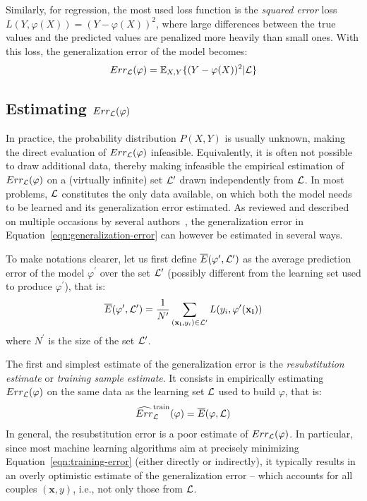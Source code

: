 Similarly, for regression, the most used loss function is the \textit{squared
error} loss $L(Y, \varphi(X)) = (Y - \varphi(X))^2$, where large differences
between the true values and the predicted values are penalized more heavily
than small ones. With this loss, the generalization error of the model becomes:
\begin{equation}
Err_{\cal L}(\varphi) = \mathbb{E}_{X, Y}\{ (Y - \varphi(X))^2 | {\cal L} \}
\end{equation}

\subsection{Estimating $Err_{\cal L}(\varphi)$}
\label{sec:estimating-generalization-error}

In practice, the probability distribution $P(X, Y)$ is usually unknown, making
the direct evaluation of $Err_{\cal L}(\varphi)$ infeasible. Equivalently, it
is often not possible to draw additional data, thereby making infeasible the
empirical estimation of $Err_{\cal L}(\varphi)$ on a (virtually infinite) set
${\cal L}'$ drawn independently from ${\cal L}$. In most problems, ${\cal L}$
constitutes the only data available, on which both the model needs to be
learned and its generalization error estimated. As reviewed and described on
multiple occasions by several
authors~\citep{toussaint:1974,stone:1978,breiman:1984,kohavi:1995,nadeau:2003,hastie:2005,arlot:2010},
the generalization error in Equation~\ref{eqn:generalization-error} can however
be estimated in several ways.

To make notations clearer, let us first define $\overline{E}(\varphi^\prime, {\cal
L}^\prime)$ as the average prediction error of the model $\varphi^\prime$ over the set
${\cal L}^\prime$ (possibly different from the learning set used to produce
$\varphi^\prime$), that is:
\begin{equation}
\overline{E}(\varphi^\prime, {\cal L}^\prime) = \frac{1}{N^\prime} \sum_{(\mathbf{x_i}, y_i) \in {\cal L}^\prime} L(y_i, \varphi^\prime(\mathbf{x_i}))
\end{equation}
where $N^\prime$ is the size of the set ${\cal L}^\prime$.

The first and simplest estimate of the generalization error is the
\textit{resubstitution estimate} or \textit{training sample estimate}. It
consists in empirically estimating $Err_{\cal L}(\varphi)$ on the same data as
the learning set ${\cal L}$ used to build $\varphi$, that is:
\begin{equation}\label{eqn:training-error}
\widehat{Err}_{\cal L}^\text{train}(\varphi) = \overline{E}(\varphi, {\cal L})
\end{equation}
In general, the resubstitution error is a poor estimate of $Err_{\cal
L}(\varphi)$. In particular, since most machine learning algorithms aim at
precisely minimizing Equation~\ref{eqn:training-error} (either directly or
indirectly), it typically results in an overly optimistic estimate of the
generalization error -- which accounts for all couples $(\mathbf{x}, y)$, i.e.,
not only those from ${\cal L}$.

